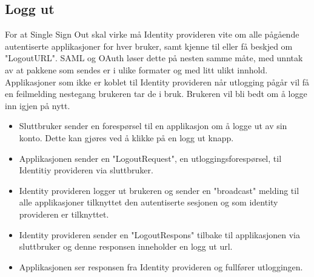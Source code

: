 \subsection{Logg ut}
\label{subsec:konfigurasjon_innloggingsmekanismer_loggUt}
For at Single Sign Out skal virke må Identity provideren vite om alle pågående autentiserte applikasjoner for hver bruker, samt kjenne til eller få beskjed om "LogoutURL". SAML og OAuth løser dette på nesten samme måte, med unntak av at pakkene som sendes er i ulike formater og med litt ulikt innhold. Applikasjoner som ikke er koblet til Identity provideren når utlogging pågår vil få en feilmelding nestegang brukeren tar de i bruk. Brukeren vil bli bedt om å logge inn igjen på nytt.

\begin{itemize}
\item Sluttbruker sender en forespørsel til en applikasjon om å logge ut av sin konto. Dette kan gjøres ved å klikke på en logg ut knapp.
\item Applikasjonen sender en "LogoutRequest", en utloggingsforespørsel, til Identitiy provideren via sluttbruker. 
\item Identity provideren logger ut brukeren og sender en "broadcast" melding til alle applikasjoner tilknyttet den autentiserte sesjonen og som identity provideren er tilknyttet.
\item Identity provideren sender en "LogoutRespons" tilbake til applikasjonen via sluttbruker og denne responsen inneholder en logg ut url. 
\item Applikasjonen ser responsen fra Identity provideren og fullfører utloggingen.
\end{itemize}

